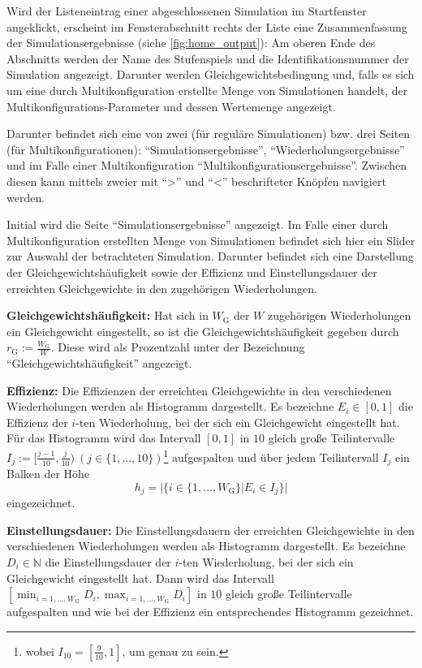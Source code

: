 \documentclass[parskip=full,11pt]{scrartcl}
\begin{document}
Wird der Listeneintrag einer abgeschlossenen Simulation im Startfenster angeklickt, erscheint im Fensterabschnitt rechts der Liste eine Zusammenfassung der Simulationsergebnisse (siehe \cref{fig:home_output}): Am oberen Ende des Abschnitts werden der Name des Stufenspiels und die Identifikationsnummer der Simulation angezeigt. Darunter werden Gleichgewichtsbedingung und, falls es sich um eine durch Multikonfiguration erstellte Menge von Simulationen handelt, der Multikonfigurations-Parameter und dessen Wertemenge angezeigt.

Darunter befindet sich eine von zwei (für reguläre Simulationen) bzw. drei Seiten (für Multikonfigurationen): \enquote{Simulationsergebnisse}, \enquote{Wiederholungsergebnisse} und im Falle einer Multikonfiguration \enquote{Multikonfigurationsergebnisse}. Zwischen diesen kann mittels zweier mit \enquote{>} und \enquote{<} beschrifteter Knöpfen navigiert werden.

Initial wird die Seite \enquote{Simulationsergebnisse} angezeigt. Im Falle einer durch Multikonfiguration erstellten Menge von Simulationen befindet sich hier ein Slider zur Auswahl der betrachteten Simulation. Darunter befindet sich eine Darstellung der Gleichgewichtshäufigkeit sowie der Effizienz und Einstellungsdauer der erreichten Gleichgewichte in den zugehörigen Wiederholungen.

\textbf{Gleichgewichtshäufigkeit:}
Hat sich in \(W_\text{G}\) der \(W\) zugehörigen Wiederholungen ein Gleichgewicht eingestellt, so ist die Gleichgewichtshäufigkeit gegeben durch \(r_\text{G} := \frac{W_\text{G}}{W}\). Diese wird als Prozentzahl unter der Bezeichnung \enquote{Gleichgewichtshäufigkeit} angezeigt.

\textbf{Effizienz:}
Die Effizienzen der erreichten Gleichgewichte in den verschiedenen Wiederholungen werden als Histogramm dargestellt. Es bezeichne \(E_i \in [0,1]\) die Effizienz der \(i\)-ten Wiederholung, bei der sich ein Gleichgewicht eingestellt hat. Für das Histogramm wird das Intervall \([0,1]\) in \(10\) gleich große Teilintervalle \(I_j := [\frac{j-1}{10},\frac{j}{10}) \ (j \in \{1,...,10\})\)\footnote{wobei \(I_{10} = [\frac{9}{10},1]\), um genau zu sein.} aufgespalten und über jedem Teilintervall \(I_j\) ein Balken der Höhe
\[
h_j = |\{i \in \{1,...,W_\text{G}\} | E_i \in I_j\}|
\]
eingezeichnet.

\textbf{Einstellungsdauer:}
Die Einstellungsdauern der erreichten Gleichgewichte in den verschiedenen Wiederholungen werden als Histogramm dargestellt. Es bezeichne \(D_i \in \mathbb{N}\) die Einstellungsdauer der \(i\)-ten Wiederholung, bei der sich ein Gleichgewicht eingestellt hat. Dann wird das Intervall \([\min_{i = 1,...,W_\text{G}} D_i, \max_{i = 1,...,W_\text{G}} D_i]\) in \(10\) gleich große Teilintervalle aufgespalten und wie bei der Effizienz ein entsprechendes Histogramm gezeichnet.
\end{document}
